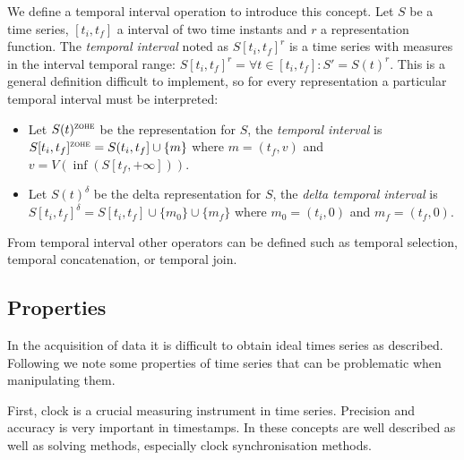 

We define a temporal interval operation to introduce this
concept.
Let $S$ be a time series, $[t_i,t_f]$ a interval of two time instants
and $r$ a representation function. The \emph{temporal interval} noted
as $S[t_i,t_f]^r$ is a time series with measures in the interval
temporal range: $S[t_i,t_f]^r= \forall t \in [t_i,t_f] : S' = S(t)^r
$. This is a general definition difficult to implement, so for every
representation a particular temporal interval must be interpreted:

\begin{itemize}
\item Let $S(t)^\zohe{}$ be the \zohe{} representation for $S$, the
  \emph{\zohe{} temporal interval} is $S[t_i,t_f]^\zohe{} = S(t_i,t_f]
  \cup \{m\}$ where $m=(t_f,v)$ and $v= V(\inf( S[t_f,+\infty] ))$.

\item Let $S(t)^\delta$ be the delta representation for $S$, the
  \emph{delta temporal interval} is $S[t_i,t_f]^\delta = S[t_i,t_f]
  \cup \{m_0\} \cup \{m_f\}$ where $m_0=(t_i,0)$ and $m_f=(t_f,0)$.
\end{itemize}



From temporal interval other operators can be defined such as temporal
selection, temporal concatenation, or temporal join.




\subsection{Properties}
\label{sec:model:properties} 

In the acquisition of data it is difficult to obtain ideal times
series as described. Following we note some properties of time series
that can be problematic when manipulating them.

First, clock is a crucial measuring instrument in time
series. Precision and accuracy is very important in timestamps.  In
\cite{kopetz11:realtime} these concepts are well described as well as
solving methods, especially clock synchronisation methods.


